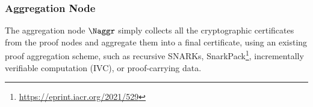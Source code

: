 \documentclass{article}
\begin{document}
\begin{comment}
Let $1 \le i \le n$ and
$\pibn{i} = \PPbasic(\enGamman{i}, \enDeltan{i}, \envarphin{i}, \alpha_i)$,
which is the cryptographic certificate for checking the one-step
Hilbert proof for $\varphi_i$.
However, it is not enough to just check the correctness of
$\pibn{i}$ for $1 \le i \le n$.
We also need to ensure that all the $\pibn{i}$'s belong to the same
Hilbert proof and agree on the same underlying theory that is being used.
More specifically, we need to ensure that
\begin{enumerate}
\item $\Gamma_i = \Gamma$ for all $1 \le i \le n$, where $\Gamma$ is the
      underlying theory in \Cref{eq:goal}.
\item $\Delta_1 = \emptyset$ and $\Delta_i \subseteq
      \{\varphi_1,\dots,\varphi_{i-1}\}$ for all $2 \le i \le n$.
\end{enumerate}

We can use cryptographic commitment schemes to synchronize the $n$ instances of basic procedures and share the necessary information among them.
We build a Merkel tree $\MT$
with $N = 2^{\ceil{\log_2(n+1)}}$ leaf nodes.
In other words, $N$ is the smallest power of 2 such that $N \ge n+1$.
From left to right, the first leaf node has the hash of $\Gamma$, denoted
$\hof{\Gamma}$.
The second to the $(n+1)$-th leaf nodes are the hashes of
$\varphi_1,\dots,\varphi_n$, respectively.
The rest leaf nodes are filled with the hashes of a distinguished value,
denoted $\hof{\bot}$, indicating that they do not represent any meaningful components of the Hilbert proof.
Let $\cMT$ be the hash associated with the root of $\MT$.
Note that $\cMT$ can be computed solely from the Hilbert proof.

To ensure the second condition regarding $\Delta_i$'s, we build another
Merkel tree $\MM$ of the same size as $\MT$.
The leaf nodes of $\MM$ are the hash values of the cryptographic certificates
for proving the patterns whose hash values are associated with the leaf nodes of $\MT$ at the corresponding locations.
More specifically, from left to right, the first leaf node of $\MM$ is left empty (i.e., $\hof{\bot}$).
The second to the $(n+1)$-th leaf nodes are hashes of
$\pibn{1},\dots,\pibn{n}$, respectively.
For every $i$, we check that $\Delta_i$ only uses patterns in $\MT$
that are located on the left side of $\varphi_i$.
\end{comment}

\subsubsection{Aggregation Node}

The aggregation node $\Naggr$ simply collects
all the cryptographic certificates from the proof nodes and aggregate them
into a final certificate, using an existing proof aggregation
scheme,  such as recursive SNARKs,
SnarkPack\footnote{\url{https://eprint.iacr.org/2021/529}},
incrementally verifiable computation (IVC),
or proof-carrying data.
\end{document}
